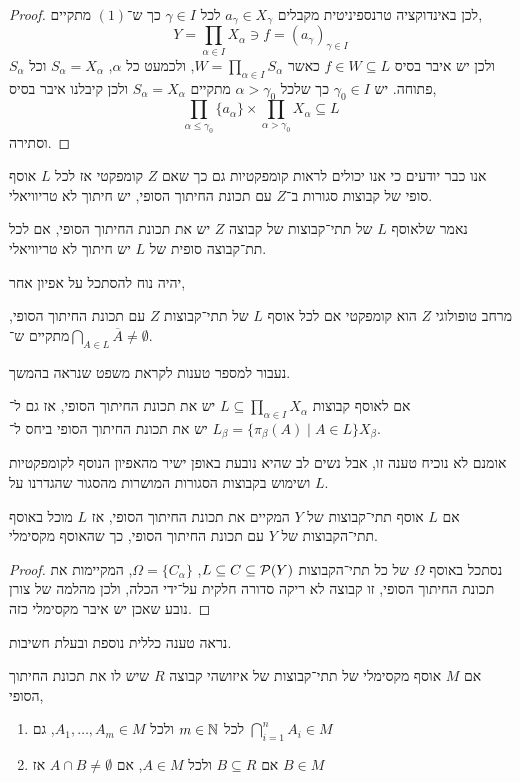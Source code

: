 \begin{proof}
	לכן באינדוקציה טרנספיניטית מקבלים $a_{\gamma} \in X_{\gamma}$ לכל $\gamma \in I$ כך ש־$(1)$ מתקיים,
	\[
		Y = \prod_{\alpha \in I} X_{\alpha} \ni f = {( a_{\gamma} )}_{\gamma \in I}
	\]
	ולכן יש איבר בסיס $f \in W \subseteq L$ כאשר $W = \prod_{\alpha \in I} S_{\alpha}$, ולכמעט כל $\alpha$, $S_{\alpha} = X_{\alpha}$ וכל $S_{\alpha}$ פתוחה.
	יש $\gamma_0 \in I$ כך שלכל $\alpha > \gamma_0$ מתקיים $S_{\alpha} = X_{\alpha}$ ולכן קיבלנו איבר בסיס,
	\[
		\prod_{\alpha \le \gamma_0} \{ a_{\alpha} \} \times \prod_{\alpha > \gamma_0} X_{\alpha} \subseteq L
	\]
	וסתירה.
\end{proof}
אנו כבר יודעים כי אנו יכולים לראות קומפקטיות גם כך שאם $Z$ קומפקטי אז לכל $L$ אוסף סופי של קבוצות סגורות ב־$Z$ עם תכונת החיתוך הסופי, יש חיתוך לא טריוויאלי.
\begin{definition}
	נאמר שלאוסף $L$ של תתי־קבוצות של קבוצה $Z$ יש את תכונת החיתוך הסופי, אם לכל תת־קבוצה סופית של $L$ יש חיתוך לא טריוויאלי.
\end{definition}
יהיה נוח להסתכל על אפיון אחר,
\begin{proposition}
	מרחב טופולוגי $Z$ הוא קומפקטי אם לכל אוסף $L$ של תתי־קבוצות $Z$ עם תכונת החיתוך הסופי, מתקיים ש־$\bigcap_{A \in L} \overline{A} \ne \emptyset$.
\end{proposition}
נעבור למספר טענות לקראת משפט שנראה בהמשך.
\begin{proposition}
	אם לאוסף קבוצות $L \subseteq \prod_{\alpha \in I} X_{\alpha}$ יש את תכונת החיתוך הסופי, אז גם ל־$L_{\beta} = \{ \pi_{\beta}(A) \mid A \in L \}$ יש את תכונת החיתוך הסופי ביחס ל־$X_{\beta}$.
\end{proposition}
אומנם לא נוכיח טענה זו, אבל נשים לב שהיא נובעת באופן ישיר מהאפיון הנוסף לקומפקטיות ושימוש בקבוצות הסגורות המושרות מהסגור שהגדרנו על $L$.
\begin{proposition}
	אם $L$ אוסף תתי־קבוצות של $Y$ המקיים את תכונת החיתוך הסופי, אז $L$ מוכל באוסף תתי־הקבוצות של $Y$ עם תכונת החיתוך הסופי, כך שהאוסף מקסימלי.
\end{proposition}
\begin{proof}
	נסתכל באוסף $\Omega$ של כל תתי־הקבוצות $L \subseteq C \subseteq \mathcal{P}(Y)$,
	$\Omega = \{ C_{\alpha} \}$, המקיימות את תכונת החיתוך הסופי,
	זו קבוצה לא ריקה סדורה חלקית על־ידי הכלה, ולכן מהלמה של צורן נובע שאכן יש איבר מקסימלי כזה.
\end{proof}
נראה טענה כללית נוספת ובעלת חשיבות.
\begin{proposition}\label{maximal_collection_of_closed_cap_proposition}
	אם $M$ אוסף מקסימלי של תתי־קבוצות של איזושהי קבוצה $R$ שיש לו את תכונת החיתוך הסופי,
	\begin{enumerate}
		\item לכל $m \in \mathbb{N}$ ולכל $A_1, \ldots, A_m \in M$, גם $\bigcap_{i = 1}^n A_i \in M$
		\item אם $B \subseteq R$ ולכל $A \in M$, אם $A \cap B \ne \emptyset$ אז $B \in M$
	\end{enumerate}
\end{proposition}

